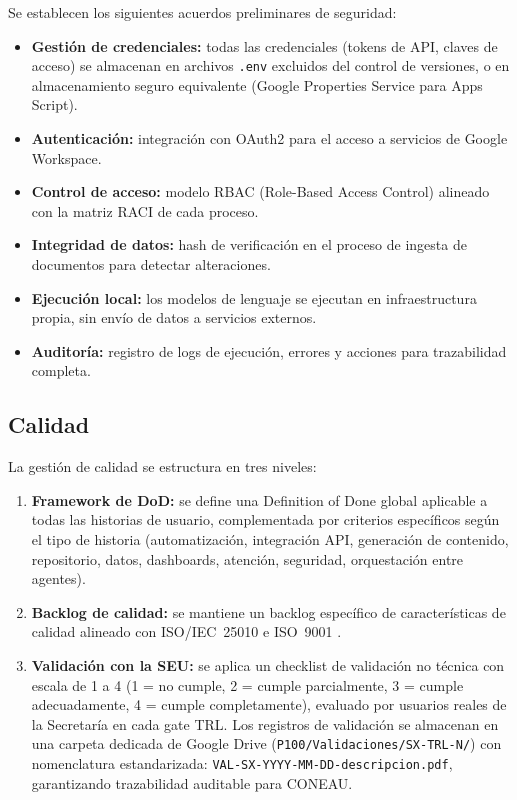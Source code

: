 \documentclass[a4paper, 12pt]{article}
\begin{document}
Se establecen los siguientes acuerdos preliminares de seguridad:

\begin{itemize}
  \item \textbf{Gesti\'on de credenciales:} todas las credenciales (tokens de API, claves de acceso) se almacenan en archivos \texttt{.env} excluidos del control de versiones, o en almacenamiento seguro equivalente (Google Properties Service para Apps Script).
  \item \textbf{Autenticaci\'on:} integraci\'on con OAuth2 para el acceso a servicios de Google Workspace.
  \item \textbf{Control de acceso:} modelo RBAC (Role-Based Access Control) alineado con la matriz \ac{RACI} de cada proceso.
  \item \textbf{Integridad de datos:} hash de verificaci\'on en el proceso de ingesta de documentos para detectar alteraciones.
  \item \textbf{Ejecuci\'on local:} los modelos de lenguaje se ejecutan en infraestructura propia, sin env\'io de datos a servicios externos.
  \item \textbf{Auditor\'ia:} registro de logs de ejecuci\'on, errores y acciones para trazabilidad completa.
\end{itemize}

\subsection{Calidad}

La gesti\'on de calidad se estructura en tres niveles:

\begin{enumerate}[label=\arabic*.]
  \item \textbf{Framework de \ac{DoD}:} se define una Definition of Done global aplicable a todas las historias de usuario, complementada por criterios espec\'ificos seg\'un el tipo de historia (automatizaci\'on, integraci\'on API, generaci\'on de contenido, repositorio, datos, dashboards, atenci\'on, seguridad, orquestaci\'on entre agentes).

  \item \textbf{Backlog de calidad:} se mantiene un backlog espec\'ifico de caracter\'isticas de calidad alineado con ISO/IEC~25010 \parencite{iso25010} e ISO~9001 \parencite{iso9001}.

  \item \textbf{Validaci\'on con la \ac{SEU}:} se aplica un checklist de validaci\'on no t\'ecnica con escala de 1 a 4 (1 = no cumple, 2 = cumple parcialmente, 3 = cumple adecuadamente, 4 = cumple completamente), evaluado por usuarios reales de la Secretar\'ia en cada gate \ac{TRL}. Los registros de validaci\'on se almacenan en una carpeta dedicada de Google Drive (\texttt{P100/Validaciones/SX-TRL-N/}) con nomenclatura estandarizada: \texttt{VAL-SX-YYYY-MM-DD-descripcion.pdf}, garantizando trazabilidad auditable para \ac{CONEAU}.
\end{enumerate}
\end{document}
